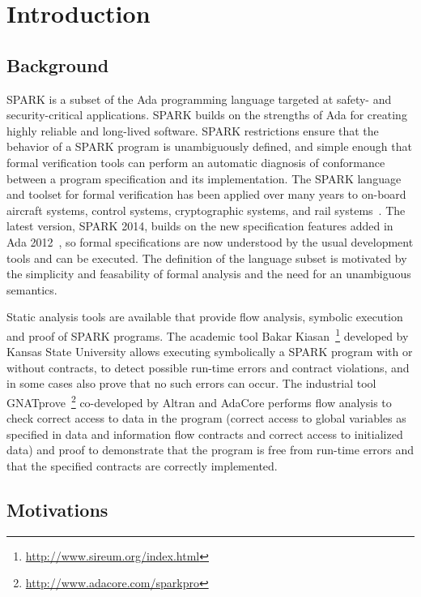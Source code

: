 \section{Introduction}

\subsection{Background}

SPARK is a subset of the Ada programming language targeted at safety- and
security-critical applications. SPARK builds on the strengths of Ada for
creating highly reliable and long-lived software. SPARK restrictions ensure
that the behavior of a SPARK program is unambiguously defined, and simple
enough that formal verification tools can perform an automatic diagnosis of
conformance between a program specification and its implementation. The SPARK
language and toolset for formal verification has been applied over many years
to on-board aircraft systems, control systems, cryptographic systems, and rail
systems~\cite{sparkbook2012,oneill2012}. The latest version, SPARK 2014, builds
on the new specification features added in Ada 2012~\cite{ada2012rationale}, so
formal specifications are now understood by the usual development tools and can
be executed.  The definition of the language subset is motivated by the
simplicity and feasability of formal analysis and the need for an unambiguous
semantics.

Static analysis tools are available that provide flow analysis, symbolic
execution and proof of SPARK programs. The academic tool Bakar
Kiasan~\footnote{\url{http://www.sireum.org/index.html}} developed by Kansas
State University allows executing symbolically a SPARK program with or without
contracts, to detect possible run-time errors and contract violations, and in
some cases also prove that no such errors can occur. The industrial tool
GNATprove~\footnote{\url{http://www.adacore.com/sparkpro}} co-developed by
Altran and AdaCore performs flow analysis to check correct access to data in
the program (correct access to global variables as specified in data and
information flow contracts and correct access to initialized data) and proof to
demonstrate that the program is free from run-time errors and that the
specified contracts are correctly implemented.

\subsection{Motivations}

